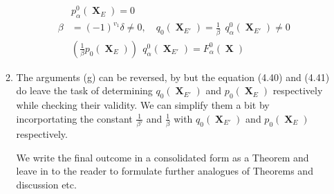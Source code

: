 \documentclass[a4paper,12pt]{article}
\DeclareMathOperator{\x}{\mathrm{X}}
\theoremstyle{definition}
\theoremstyle{underlinethm}
\theoremstyle{definition}
\begin{document}
\begin{enumerate}[label=(\alph*)]
\begin{enumerate}[label=(\alph*)]
\begin{align*}
&p_{\alpha}^{0} (\boldsymbol{\x}_{E}) = 0\tag{4.41}\label{eq-4.41}\\
\beta &= (-1)^{v_{1}} \delta \neq 0, \quad q_{0}(\boldsymbol{\x}_{E'}) = \frac{1}{\beta} ~~q_{\alpha}^{0} (\boldsymbol{\x}_{E'}) \neq 0\tag{4.42}\label{eq-4.42}\\
&\left(\frac{1}{\beta} p_{0}(\boldsymbol{\x}_{E}) \right)~~q_{\alpha}^{0} (\boldsymbol{\x}_{E'}) = F_{\alpha}^{0}(\boldsymbol{\x})\tag{4.43}\label{eq-4.43}
\end{align*} 

\item The arguments (g) can be reversed, by but the equation (4.40) and (4.41) do leave the task of determining $q_{0}(\boldsymbol{\x}_{E'})$ and $p_{0}(\boldsymbol{\x}_{E})$  respectively while checking their validity. We can simplify them a bit by incorportating the constant $\frac{1}{\beta'}$ and $\frac{1}{\beta}$ with $q_{0}(\boldsymbol{\x}_{E'})$ and $p_{0}(\boldsymbol{\x}_{E})$ respectively.

We write the final outcome in a consolidated form as a Theorem and leave in to the reader to formulate further analogues of Theorems and discussion etc.
\end{enumerate}
\end{enumerate}
\end{document}
